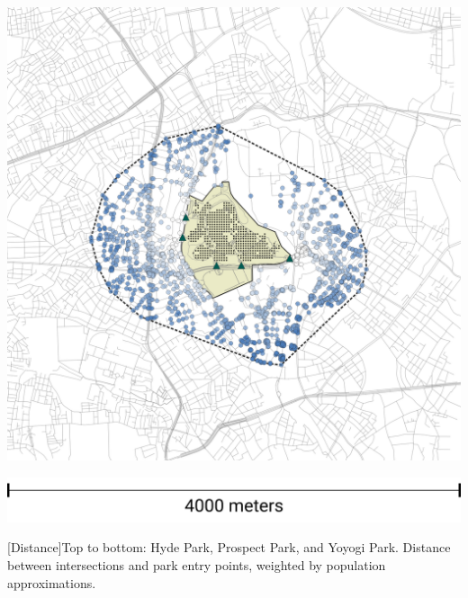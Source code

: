 \begin{multicols}{2}
\begin{minipage}{0.45\textwidth}
    \includegraphics[width=\linewidth]{images/network/yoyogi_intersections_distance.png}\par\hspace{3pt}  \includegraphics[width=\linewidth]
    {images/network/scale_legend_5.png}\par{}[Distance]{Top to bottom: Hyde Park, Prospect Park, and Yoyogi Park. Distance between intersections and park entry points, weighted by population approximations.}
    \label{fig:network_distance}
\end{minipage}

\end{multicols}

